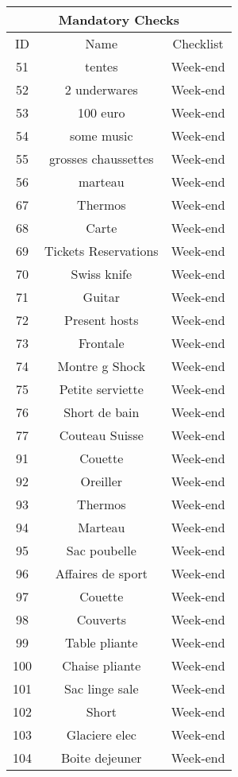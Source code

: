 \begin{longtable}{|c|c|c|}
\hline
\multicolumn{3}{|c|}{Mandatory Checks} \\
\hline
ID & Name & Checklist\\
\hline
51 & tentes & Week-end\\
\hline
52 & 2 underwares & Week-end\\
\hline
53 & 100 euro & Week-end\\
\hline
54 & some music & Week-end\\
\hline
55 & grosses chaussettes & Week-end\\
\hline
56 & marteau & Week-end\\
\hline
67 & Thermos & Week-end\\
\hline
68 & Carte & Week-end\\
\hline
69 & Tickets Reservations & Week-end\\
\hline
70 & Swiss knife & Week-end\\
\hline
71 & Guitar & Week-end\\
\hline
72 & Present hosts & Week-end\\
\hline
73 & Frontale & Week-end\\
\hline
74 & Montre g Shock & Week-end\\
\hline
75 & Petite serviette & Week-end\\
\hline
76 & Short de bain & Week-end\\
\hline
77 & Couteau Suisse & Week-end\\
\hline
91 & Couette & Week-end\\
\hline
92 & Oreiller & Week-end\\
\hline
93 & Thermos & Week-end\\
\hline
94 & Marteau & Week-end\\
\hline
95 & Sac poubelle & Week-end\\
\hline
96 & Affaires de sport & Week-end\\
\hline
97 & Couette & Week-end\\
\hline
98 & Couverts & Week-end\\
\hline
99 & Table pliante & Week-end\\
\hline
100 & Chaise pliante & Week-end\\
\hline
101 & Sac linge sale & Week-end\\
\hline
102 & Short & Week-end\\
\hline
103 & Glaciere elec & Week-end\\
\hline
104 & Boite dejeuner & Week-end\\
\hline
\end{longtable}

